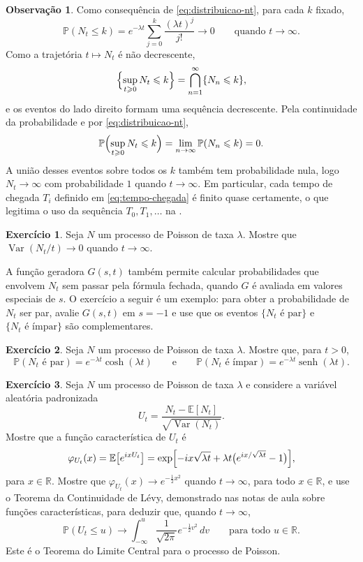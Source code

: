 \documentclass[12pt,portuguese]{article}
\theoremstyle{definition}
\newtheorem{remark}[remark]{Observação}
\theoremstyle{plainexercise}
\newtheorem{exercise}{Exercício}
\theoremstyle{starredexercise}
\theoremstyle{definition}
\begin{document}
\begin{remark}\label{rem:tempos-finitos}
Como consequência de \eqref{eq:distribuicao-nt}, para cada $k$ fixado,
\[
  \mathbb{P}(N_t\leqslant k)
  =e^{-\lambda t}\sum_{j=0}^{k}\frac{(\lambda t)^j}{j!}
  \longrightarrow0
  \qquad\text{quando } t\to\infty.
\]
Como a trajetória $t\mapsto N_t$ é não decrescente,
\[
  \Bigl\{\sup_{t\geqslant0}N_t\leqslant k\Bigr\}
  =\bigcap_{n=1}^{\infty}\{N_n\leqslant k\},
\]
e os eventos do lado direito formam uma sequência decrescente. Pela
continuidade da probabilidade e por \eqref{eq:distribuicao-nt},
\[
  \mathbb{P}\Bigl(\sup_{t\geqslant0}N_t\leqslant k\Bigr)
  =\lim_{n\to\infty}\mathbb{P}(N_n\leqslant k)=0.
\]
A união desses eventos sobre todos os $k$ também tem probabilidade nula, logo
$N_t\to\infty$ com probabilidade $1$ quando $t\to\infty$. Em particular, cada
tempo de chegada $T_i$ definido em \eqref{eq:tempo-chegada} é finito quase
certamente, o que legitima o uso da sequência $T_0,T_1,\ldots$ na
.
\end{remark}

\begin{exercise}\label{exercise:variancia-quociente}
Seja $N$ um processo de Poisson de taxa $\lambda$. Mostre que
$\operatorname{Var}(N_t/t)\to0$ quando $t\to\infty$.
\end{exercise}

A função geradora $G(s,t)$ também permite calcular probabilidades que envolvem
$N_t$ sem passar pela fórmula fechada, quando $G$ é avaliada em valores
especiais de $s$. O exercício a seguir é um exemplo: para obter a
probabilidade de $N_t$ ser par, avalie $G(s,t)$ em $s=-1$ e use que os eventos
$\{N_t\text{ é par}\}$ e $\{N_t\text{ é ímpar}\}$ são complementares.

\begin{exercise}\label{exercise:paridade-poisson}
Seja $N$ um processo de Poisson de taxa $\lambda$. Mostre que, para $t>0$,
\[
  \mathbb{P}(N_t\text{ é par})=e^{-\lambda t}\cosh(\lambda t)
  \qquad\text{e}\qquad
  \mathbb{P}(N_t\text{ é ímpar})=e^{-\lambda t}\operatorname{senh}(\lambda t).
\]
\end{exercise}

\begin{exercise}\label{exercise:fgm-clt-poisson}
Seja $N$ um processo de Poisson de taxa $\lambda$ e considere a variável
aleatória padronizada
\[
  U_t=\frac{N_t-\mathbb{E}[N_t]}{\sqrt{\operatorname{Var}(N_t)}}.
\]
Mostre que a função característica de $U_t$ é
\[
  \varphi_{U_t}(x)=\mathbb{E}\bigl[e^{ixU_t}\bigr]
  =\exp\Bigl[-ix\sqrt{\lambda t}+\lambda t\bigl(e^{ix/\sqrt{\lambda t}}-1\bigr)\Bigr],
\]
para $x\in\mathbb{R}$. Mostre que $\varphi_{U_t}(x)\to e^{-\frac{1}{2}x^2}$
quando $t\to\infty$, para todo $x\in\mathbb{R}$, e use o Teorema da
Continuidade de Lévy, demonstrado nas notas de aula sobre funções
características, para deduzir que, quando $t\to\infty$,
\[
  \mathbb{P}(U_t\leqslant u)
  \longrightarrow
  \int_{-\infty}^{u}\frac{1}{\sqrt{2\pi}}e^{-\frac{1}{2}v^2}\,dv
  \qquad\text{para todo } u\in\mathbb{R}.
\]
Este é o Teorema do Limite Central para o processo de Poisson.
\end{exercise}
\end{document}
